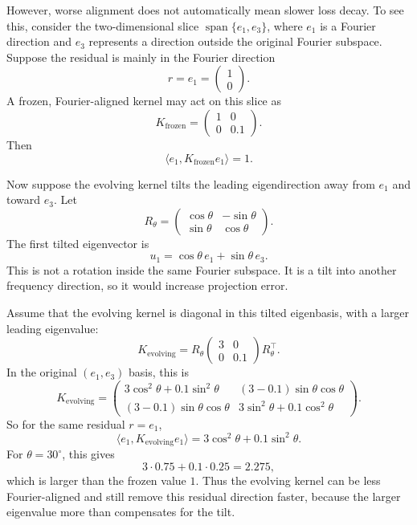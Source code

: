 \documentclass[11pt]{article}
\begin{document}
However, worse alignment does not automatically mean slower loss decay. To see
this, consider the two-dimensional slice \(\operatorname{span}\{e_1,e_3\}\),
where \(e_1\) is a Fourier direction and \(e_3\) represents a direction outside
the original Fourier subspace. Suppose the residual is mainly in the Fourier
direction
\[
	r=e_1
	=
	\begin{pmatrix}
		1 \\
		0
	\end{pmatrix}.
\]
A frozen, Fourier-aligned kernel may act on this slice as
\[
	K_{\mathrm{frozen}}
	=
	\begin{pmatrix}
		1 & 0   \\
		0 & 0.1
	\end{pmatrix}.
\]
Then
\[
	\langle e_1,K_{\mathrm{frozen}}e_1\rangle
	=
	1.
\]

Now suppose the evolving kernel tilts the leading eigendirection away from
\(e_1\) and toward \(e_3\). Let
\[
	R_\theta
	=
	\begin{pmatrix}
		\cos\theta & -\sin\theta \\
		\sin\theta & \cos\theta
	\end{pmatrix}.
\]
The first tilted eigenvector is
\[
	u_1=\cos\theta\,e_1+\sin\theta\,e_3.
\]
This is not a rotation inside the same Fourier subspace. It is a tilt into
another frequency direction, so it would increase projection error.

Assume that the evolving kernel is diagonal in this tilted eigenbasis, with a
larger leading eigenvalue:
\[
	K_{\mathrm{evolving}}
	=
	R_\theta
	\begin{pmatrix}
		3 & 0   \\
		0 & 0.1
	\end{pmatrix}
	R_\theta^\top .
\]
In the original \((e_1,e_3)\) basis, this is
\[
	K_{\mathrm{evolving}}
	=
	\begin{pmatrix}
		3\cos^2\theta+0.1\sin^2\theta
		 &
		(3-0.1)\sin\theta\cos\theta
		\\
		(3-0.1)\sin\theta\cos\theta
		 &
		3\sin^2\theta+0.1\cos^2\theta
	\end{pmatrix}.
\]
So for the same residual \(r=e_1\),
\[
	\langle e_1,K_{\mathrm{evolving}}e_1\rangle
	=
	3\cos^2\theta+0.1\sin^2\theta .
\]
For \(\theta=30^\circ\), this gives
\[
	3\cdot 0.75+0.1\cdot 0.25
	=
	2.275,
\]
which is larger than the frozen value \(1\). Thus the evolving kernel can be
less Fourier-aligned and still remove this residual direction faster, because
the larger eigenvalue more than compensates for the tilt.
\end{document}
